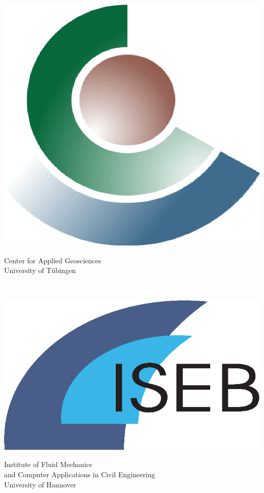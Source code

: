\thispagestyle{empty}
%
\begin{minipage}[t]{16cm}
\begin{minipage}[b]{2.25cm}
\includegraphics[width=0.75\columnwidth]{figures/logos/logo_zag.eps}  %
\end{minipage}
%
\begin{minipage}[b]{14cm}
 {\TibSF
Center for Applied Geosciences \\[1mm]
University of T\"{u}bingen}
\end{minipage}
\end{minipage}
\\[2mm]


\begin{minipage}[t]{16cm}
\begin{minipage}[b]{2.25cm}
\includegraphics[width=0.85\columnwidth]{figures/logos/logo_iseb.eps}  %
\end{minipage}
%
\begin{minipage}[c]{14cm}
 {\TibSF
Institute of Fluid Mechanics \\[1mm]
and Computer Applications in Civil Engineering \\[1mm]
University of Hannover}
\end{minipage}
\end{minipage}
%

